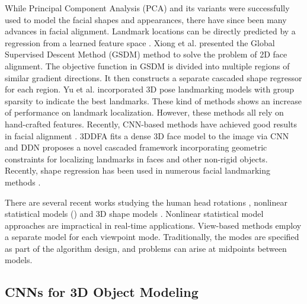 \documentclass[10pt,twocolumn,letterpaper]{article}
\begin{document}
While Principal Component Analysis (PCA) and its variants \cite{cootes1995active, cootes2001active, cristinacce2008automatic} were successfully used to model the facial shapes and appearances, there have since been many advances in facial alignment.  Landmark locations can be directly predicted by a regression from a learned feature space \cite{cao2014face, dantone2012real, xiong2013supervised}. Xiong et al. \cite{xiong2015global} presented the Global Supervised Descent Method (GSDM) method to solve the problem of 2D face alignment. The objective function in GSDM is divided into multiple regions of similar gradient directions. It then constructs a separate cascaded shape regressor for each region. Yu et al. \cite{yu2013pose} incorporated 3D pose landmarking models with group sparsity to indicate the best landmarks. These kind of methods shows an increase of performance on landmark localization. However, these methods all rely on hand-crafted features. 
Recently, CNN-based methods have achieved good results in facial alignment \cite{Zhu16falp, yu2016deep}. 3DDFA \cite{Zhu16falp} fits a dense 3D face model to the image via CNN and DDN \cite{yu2016deep} proposes a novel cascaded framework incorporating geometric constraints for localizing landmarks in faces and other non-rigid objects. Recently, shape regression has been used in numerous facial landmarking methods \cite{Tzimiropoulos2015, RenICCV2014, Artizzu2013}. 



There are several recent works studying the human head rotations \cite{Cootes2015, Zhu2012}, nonlinear statistical models (\cite{Duong2015BeyondPC}) and 3D shape models \cite{Cao2013, Gu2006}. Nonlinear statistical model approaches are impractical in real-time applications. View-based methods employ a separate model for each viewpoint mode. Traditionally, the modes are specified as part of the algorithm design, and problems can arise at midpoints between models. 



\subsection{CNNs for 3D Object Modeling}
\end{document}
